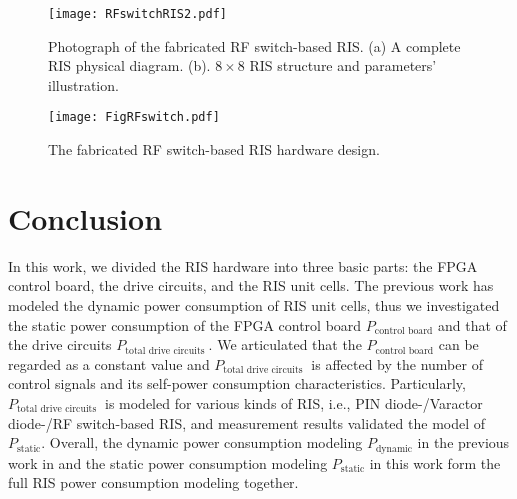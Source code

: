 \documentclass[journal]{IEEEtran}
\begin{document}
\begin{figure}
\centering
\texttt{[image: RFswitchRIS2.pdf]}
\caption{Photograph of the fabricated RF switch-based RIS. (a) A complete RIS physical diagram. (b). $8 \times 8$ RIS structure and parameters' illustration.}
\label{6}  
\vspace{-0.2cm}
\end{figure}
\begin{figure}
\centering
\texttt{[image: FigRFswitch.pdf]}
\caption{The fabricated RF switch-based RIS hardware design.}
\label{7}
\vspace{-0.2cm}
\end{figure}

\section{Conclusion}
In this work, we divided the RIS hardware into three basic parts: the FPGA control board, the drive circuits, and the RIS unit cells. The previous work has modeled the dynamic power consumption of RIS unit cells, thus we investigated the static power consumption of the FPGA control board $P_{\text {control board}}$ and that of the drive circuits $P_{\text {total drive circuits }}$. 
We articulated that the $P_{\text {control board}}$ can be regarded as a constant value and $P_{\text {total drive circuits }}$ is affected by the number of control signals and its self-power consumption characteristics. Particularly, $P_{\text {total drive circuits }}$ is modeled for various kinds of RIS, i.e., PIN diode-/Varactor diode-/RF switch-based RIS, and measurement results validated the model of $P_{\text {static}}$. Overall, the dynamic power consumption modeling $P_{\text {dynamic}}$ in the previous work in \cite{wang2022reconfigurable} and the static power consumption modeling $P_{\text {static}}$ in this work form the full RIS power consumption modeling together. 

\vspace{-0.1cm}

\ifCLASSOPTIONcaptionsoff
  \newpage
\fi


 
 
 
\end{document}

